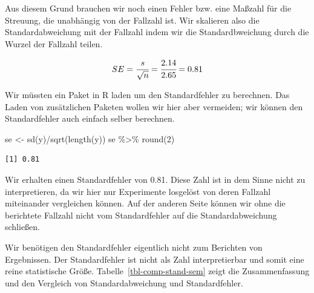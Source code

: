 \documentclass[
  letterpaper,
  DIV=11,
  oneside]{scrreport}
\newenvironment{Shaded}{\begin{snugshade}}{\end{snugshade}}
\newcommand{\DecValTok}[1]{\textcolor[rgb]{0.68,0.00,0.00}{#1}}
\newcommand{\FunctionTok}[1]{\textcolor[rgb]{0.28,0.35,0.67}{#1}}
\newcommand{\NormalTok}[1]{\textcolor[rgb]{0.00,0.23,0.31}{#1}}
\newcommand{\OtherTok}[1]{\textcolor[rgb]{0.00,0.23,0.31}{#1}}
\newcommand{\SpecialCharTok}[1]{\textcolor[rgb]{0.37,0.37,0.37}{#1}}
\begin{document}
Aus diesem Grund brauchen wir noch einen Fehler bzw. eine Maßzahl für
die Streuung, die unabhängig von der Fallzahl ist. Wir skalieren also
die Standardabweichung mit der Fallzahl indem wir die Standardbweichung
durch die Wurzel der Fallzahl teilen.

\[
SE = \cfrac{s}{\sqrt{n}} = \cfrac{2.14}{2.65} = 0.81
\]

Wir müssten ein Paket in R laden um den Standardfehler zu berechnen. Das
Laden von zusätzlichen Paketen wollen wir hier aber vermeiden; wir
können den Standardfehler auch einfach selber berechnen.

\begin{Shaded}
\begin{Highlighting}[]
\NormalTok{se }\OtherTok{\textless{}{-}} \FunctionTok{sd}\NormalTok{(y)}\SpecialCharTok{/}\FunctionTok{sqrt}\NormalTok{(}\FunctionTok{length}\NormalTok{(y))}
\NormalTok{se }\SpecialCharTok{\%\textgreater{}\%} \FunctionTok{round}\NormalTok{(}\DecValTok{2}\NormalTok{)}
\end{Highlighting}
\end{Shaded}

\begin{verbatim}
[1] 0.81
\end{verbatim}

Wir erhalten einen Standardfehler von 0.81. Diese Zahl ist in dem Sinne
nicht zu interpretieren, da wir hier nur Experimente losgelöst von deren
Fallzahl miteinander vergleichen können. Auf der anderen Seite können
wir ohne die berichtete Fallzahl nicht vom Standardfehler auf die
Standardabweichung schließen.

{}

Wir benötigen den Standardfehler eigentlich nicht zum Berichten von
Ergebnissen. Der Standardfehler ist nicht als Zahl interpretierbar und
somit eine reine statistische Größe. Tabelle~\ref{tbl-comp-stand-sem}
zeigt die Zusammenfassung und den Vergleich von Standardabweichung und
Standardfehler.
\end{document}
